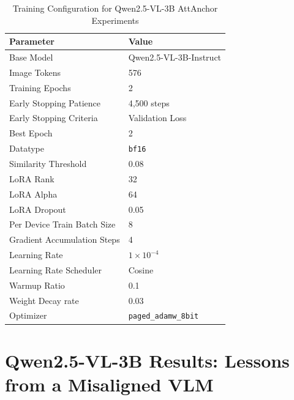 \documentclass[11pt]{article}
\begin{document}
\begin{table}[H]
    \centering
    \small
    \begin{tabular}{ll}
    \hline
    \textbf{Parameter}       & \textbf{Value}               \\
    \hline
    Base Model          & Qwen2.5-VL-3B-Instruct                            \\
    Image Tokens          & 576 \\
    Training Epochs          & 2                            \\
    Early Stopping Patience  & 4,500 steps
           \\
    Early Stopping Criteria  & Validation Loss
           \\
    Best Epoch               & 2
           \\
    Datatype                 & \texttt{bf16}                \\
    Similarity Threshold                & 0.08                            \\
    LoRA Rank                & 32                            \\
    LoRA Alpha                & 64                            \\
    LoRA Dropout             & 0.05                         \\
    Per Device Train Batch Size         & 8
    \\
    Gradient Accumulation Steps  & 4
    \\
    Learning Rate            & $1 \times 10^{-4}$ 
    \\
    Learning Rate Scheduler           & Cosine 
    \\
    
    Warmup Ratio                 & 0.1                \\
    Weight Decay rate                 & 0.03                \\
    Optimizer                & \texttt{paged\_adamw\_8bit}  \\
    \hline
    \end{tabular}
    \caption{Training Configuration for Qwen2.5-VL-3B AttAnchor Experiments}
    \label{tab:cos_train_config_3b}
    \end{table}



\section{Qwen2.5-VL-3B Results: Lessons from a Misaligned VLM}
\end{document}
